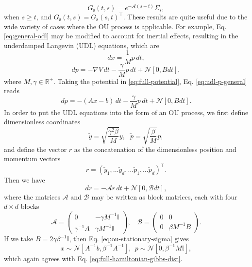\documentclass[prx,onecolumn,floatfix,longbibliography,notitlepage, nofootinbib,12pt]{revtex4-2}
\renewcommand{\geq}{\geqslant}
\begin{document}
\begin{appendix}
\begin{equation}
    G_\text{s}(t, s) = e^{-\mathcal{A} (s-t)}\Sigma_\text{s},
\end{equation}
when $s \geq t$, and $G_\text{s}(t,s) = G_\text{s}(s,t)^\intercal$. These results are quite useful due to the wide variety of cases where the OU process is applicable. For example, Eq. \eqref{eq:general-odl} may be modified to account for inertial effects, resulting in the underdamped Langevin (UDL) equations, which are
\begin{equation}
\label{eq:udl-x-general}
    dx  = \frac{1}{M} p \, dt,
\end{equation}
\begin{equation}
\label{eq:udl-p-general}
    dp = -\nabla V \, dt- \frac{\gamma}{M} p \, dt + \mathcal{N}[0,B dt],
\end{equation}
where $M, \gamma \in \mathbb{R}^+$. Taking the potential in \eqref{eq:full-potential}, Eq. \eqref{eq:udl-p-general} reads
\begin{equation}
\label{eq:udl-p-device}
    dp = -(A x - b)\, dt- \frac{\gamma}{M} p \, dt + \mathcal{N}[0,B dt].
\end{equation}
In order to put the UDL equations into the form of an OU process, we first define dimensionless coordinates
\begin{equation}
    \tilde{y} =\sqrt{\frac{\gamma^2 \beta}{M}}y, \: \: \: \tilde{p} = \sqrt{\frac{\beta}{M}}p,
\end{equation}
and define the vector $r$ as the concatenation of the dimensionless position and momentum vectors
\begin{equation}
\label{r-def-app}
    r = \left(\tilde{y}_1, \dots \tilde{y}_d, \dots \tilde{p}_1, \dots \tilde{p}_d\right)^\intercal.
\end{equation}
Then we have
\begin{equation}
    \label{UDL-vec}
    dr = -\mathcal{A} r\, dt + \mathcal{N}[0, \mathcal{B} dt],
\end{equation}
where the matrices $\mathcal{A}$ and $\mathcal{B}$ may be written as block matrices, each with four $d \times d$ blocks
\begin{equation}
    \mathcal{A} = \begin{pmatrix}
    0 & -\gamma M^{-1}\mathbb{I} \\
    \gamma^{-1}A & \gamma M^{-1} \mathbb{I}
    \end{pmatrix}, \: \: \: \:
    \mathcal{B} = \begin{pmatrix}
    0 & 0  \\
    0 & \beta M^{-1} B
    \end{pmatrix}.
\end{equation}
If we take $B = 2 \gamma \beta^{-1} \mathbb{I}$, then Eq. \eqref{eq:ou-stationary-sigma} gives
\begin{equation}
    x \sim \mathcal{N}[A^{-1}b, \beta^{-1}A^{-1}], \: \: p \sim  \mathcal{N}\left[0, \beta^{-1}M \mathbb{I}\right],
\end{equation}
which again agrees with Eq. \eqref{eq:full-hamiltonian-gibbs-dist}.





\end{appendix}
\end{document}
